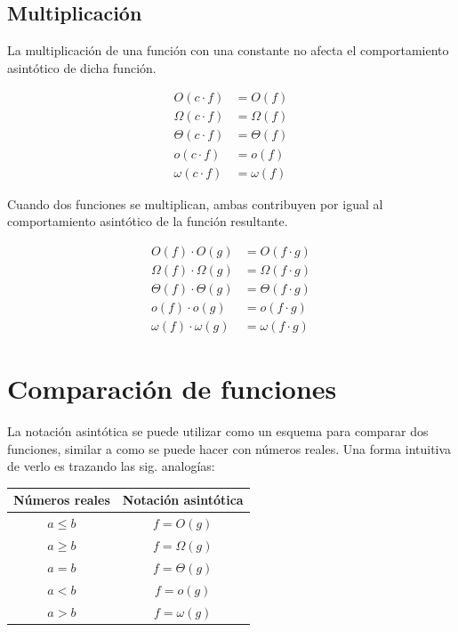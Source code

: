 \subsection{Multiplicación}

La multiplicación de una función con una constante no afecta el comportamiento
asintótico de dicha función.

\[
\begin{aligned}
    O(c\cdot f) &= O(f)\\
    \Omega(c\cdot f) &= \Omega(f)\\
    \Theta(c\cdot f) &= \Theta(f)\\
    o(c\cdot f) &= o(f)\\
    \omega(c\cdot f) &= \omega(f)
\end{aligned}
\]

Cuando dos funciones se multiplican, ambas contribuyen por igual al
comportamiento asintótico de la función resultante.

\[
\begin{aligned}
    O(f)\cdot O(g) &= O(f\cdot g)\\
    \Omega(f)\cdot\Omega(g) &= \Omega(f\cdot g)\\
    \Theta(f)\cdot\Theta(g) &= \Theta(f\cdot g)\\
    o(f)\cdot o(g) &= o(f\cdot g)\\
    \omega(f)\cdot\omega(g) &= \omega(f\cdot g)
\end{aligned}
\]


\section{Comparación de funciones}

La notación asintótica se puede utilizar como un esquema para comparar
dos funciones, similar a como se puede hacer con números reales. Una
forma intuitiva de verlo es trazando las sig. analogías:

\begin{center}
\begin{tabular}{cc}
    \toprule 
        Números reales & Notación asintótica\tabularnewline
    \midrule
        $a\leq b$ & $f=O(g)$\tabularnewline
        $a\ge b$ & $f=\Omega(g)$\tabularnewline
        $a=b$ & $f=\Theta(g)$\tabularnewline
        $a<b$ & $f=o(g)$\tabularnewline
        $a>b$ & $f=\omega(g)$\tabularnewline
    \bottomrule
\end{tabular}
\par\end{center}


